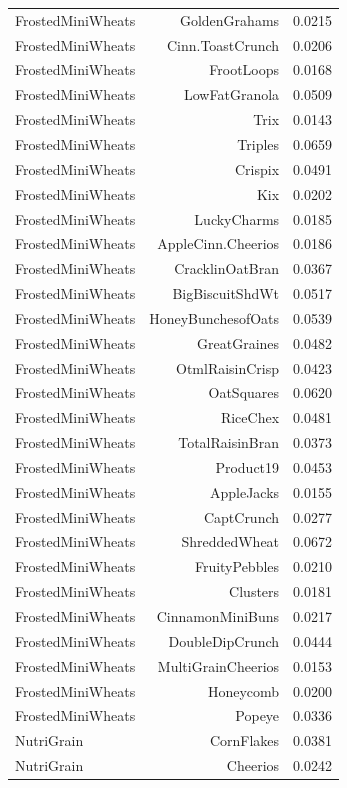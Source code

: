 \begin{longtable}{@{}lrr@{}}
FrostedMiniWheats & GoldenGrahams & 0.0215 \\
FrostedMiniWheats & Cinn.ToastCrunch & 0.0206 \\
FrostedMiniWheats & FrootLoops & 0.0168 \\
FrostedMiniWheats & LowFatGranola & 0.0509 \\
FrostedMiniWheats & Trix & 0.0143 \\
FrostedMiniWheats & Triples & 0.0659 \\
FrostedMiniWheats & Crispix & 0.0491 \\
FrostedMiniWheats & Kix & 0.0202 \\
FrostedMiniWheats & LuckyCharms & 0.0185 \\
FrostedMiniWheats & AppleCinn.Cheerios & 0.0186 \\
FrostedMiniWheats & CracklinOatBran & 0.0367 \\
FrostedMiniWheats & BigBiscuitShdWt & 0.0517 \\
FrostedMiniWheats & HoneyBunchesofOats & 0.0539 \\
FrostedMiniWheats & GreatGraines & 0.0482 \\
FrostedMiniWheats & OtmlRaisinCrisp & 0.0423 \\
FrostedMiniWheats & OatSquares & 0.0620 \\
FrostedMiniWheats & RiceChex & 0.0481 \\
FrostedMiniWheats & TotalRaisinBran & 0.0373 \\
FrostedMiniWheats & Product19 & 0.0453 \\
FrostedMiniWheats & AppleJacks & 0.0155 \\
FrostedMiniWheats & CaptCrunch & 0.0277 \\
FrostedMiniWheats & ShreddedWheat & 0.0672 \\
FrostedMiniWheats & FruityPebbles & 0.0210 \\
FrostedMiniWheats & Clusters & 0.0181 \\
FrostedMiniWheats & CinnamonMiniBuns & 0.0217 \\
FrostedMiniWheats & DoubleDipCrunch & 0.0444 \\
FrostedMiniWheats & MultiGrainCheerios & 0.0153 \\
FrostedMiniWheats & Honeycomb & 0.0200 \\
FrostedMiniWheats & Popeye & 0.0336 \\
NutriGrain & CornFlakes & 0.0381 \\
NutriGrain & Cheerios & 0.0242 \\

\end{longtable}
